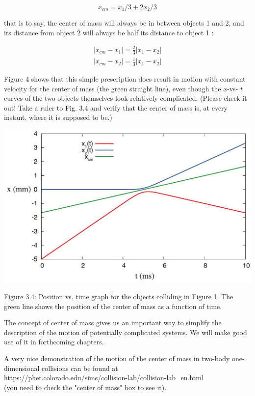 \documentclass[10pt]{article}
\begin{document}
$$
x_{c m}=x_{1} / 3+2 x_{2} / 3
$$

that is to say, the center of mass will always be in between objects 1 and 2, and its distance from object 2 will always be half its distance to object 1 :

$$
\begin{gathered}
\left|x_{c m}-x_{1}\right|=\frac{2}{3}\left|x_{1}-x_{2}\right| \\
\left|x_{c m}-x_{2}\right|=\frac{1}{3}\left|x_{1}-x_{2}\right|
\end{gathered}
$$

Figure 4 shows that this simple prescription does result in motion with constant velocity for the center of mass (the green straight line), even though the $x$-vs- $t$ curves of the two objects themselves look relatively complicated. (Please check it out! Take a ruler to Fig. 3.4 and verify that the center of mass is, at every instant, where it is supposed to be.)

\begin{center}
\includegraphics[max width=\textwidth]{2024_09_14_9969b06773f10b6936e8g-078}
\end{center}

Figure 3.4: Position vs. time graph for the objects colliding in Figure 1. The green line shows the position of the center of mass as a function of time.

The concept of center of mass gives us an important way to simplify the description of the motion of potentially complicated systems. We will make good use of it in forthcoming chapters.

A very nice demonstration of the motion of the center of mass in two-body one-dimensional collisions can be found at\\
\href{https://phet.colorado.edu/sims/collision-lab/collision-lab_en.html}{https://phet.colorado.edu/sims/collision-lab/collision-lab\_en.html}\\
(you need to check the "center of mass" box to see it).
\end{document}

